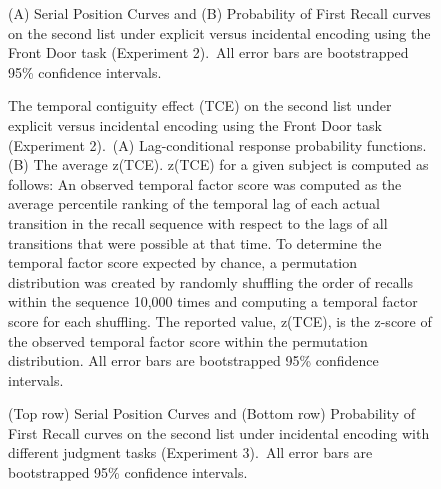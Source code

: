 \documentclass[man,natbib,floatsintext]{apa6} %
\begin{document}
\newcommand\spcpaneltext{~All error bars are bootstrapped 95\% confidence intervals.}


\newcommand\paneltext{~(A) Lag-conditional response probability functions. (B) The average z(TCE). z(TCE) for a given subject is computed as follows: An observed temporal factor score was computed as the average percentile ranking of the temporal lag of each actual transition in the recall sequence with respect to the lags of all transitions that were possible at that time. To determine the temporal factor score expected by chance, a permutation distribution was created by randomly shuffling the order of recalls within the sequence 10,000 times and computing a temporal factor score for each shuffling. The reported value, z(TCE), is the z-score of the observed temporal factor score within the permutation distribution. All error bars are bootstrapped 95\% confidence intervals.}

\begin{figure}
\caption{(A) Serial Position Curves and (B) Probability of First Recall curves on the second list under explicit versus incidental encoding using the Front Door task (Experiment 2).\spcpaneltext}
\label{e2_l2_spc}
\end{figure}


\begin{figure}%
\caption{The temporal contiguity effect (TCE) on the second list under explicit versus incidental encoding using the Front Door task (Experiment 2).\paneltext}
\label{e2_l2_crp}
\end{figure}



\begin{figure}
\caption{(Top row) Serial Position Curves and (Bottom row) Probability of First Recall curves on the second list under incidental encoding with different judgment tasks (Experiment 3).\spcpaneltext}
\label{e3_l2_spc}
\end{figure}
\end{document}
